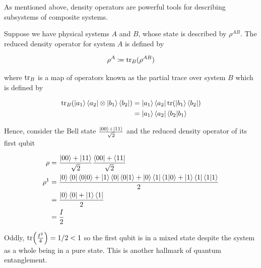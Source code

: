 \documentclass[main.tex]{subfiles}
\begin{document}
As mentioned above, density operators are powerful tools for describing subsystems of composite systems.

Suppose we have physical systems $A$ and $B$, whose state is described by $\rho^{AB}$. The reduced density operator for system $A$ is defined by

\begin{align*}
\rho^A \coloneqq \tr_B(\rho^{AB})
\end{align*}

where $\tr_B$ is a map of operators known as the partial trace over system $B$ which is defined by

\begin{align*}
\tr_B(\ket{a_1}\bra{a_2} \otimes \ket{b_1}\bra{b_2}) &= \ket{a_1}\bra{a_2} \tr( \ket{b_1}\bra{b_2}) \\
&= \ket{a_1}\bra{a_2} \bra{b_2}\ket{b_1}
\end{align*}

Hence, consider the Bell state $\frac{\ket{00} + \ket{11}}{\sqrt{2}}$ and the reduced density operator of its first qubit

\begin{align*}
\rho &= \frac{\ket{00} + \ket{11}}{\sqrt{2}}\frac{\bra{00} + \bra{11}}{\sqrt{2}} \\
\rho^1 &= \frac{\ket{0}\bra{0}\bra{0}\ket{0}+\ket{1}\bra{0}\bra{0}\ket{1}+ \ket{0}\bra{1}\bra{1}\ket{0}+ \ket{1}\bra{1}\bra{1}\ket{1}}{2} \\
&= \frac{\ket{0}\bra{0} + \ket{1}\bra{1}}{2} \\
&= \frac{I}{2}
\end{align*}

Oddly, $\tr(\frac{I^2}{4}) = 1/2 < 1$ so the first qubit is in a mixed state despite the system as a whole being in a pure state. This is another hallmark of quantum entanglement.
\end{document}

